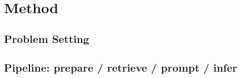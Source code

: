 \section{Method}

\subsection{Problem Setting}

\subsection{Pipeline: prepare / retrieve / prompt / infer}

